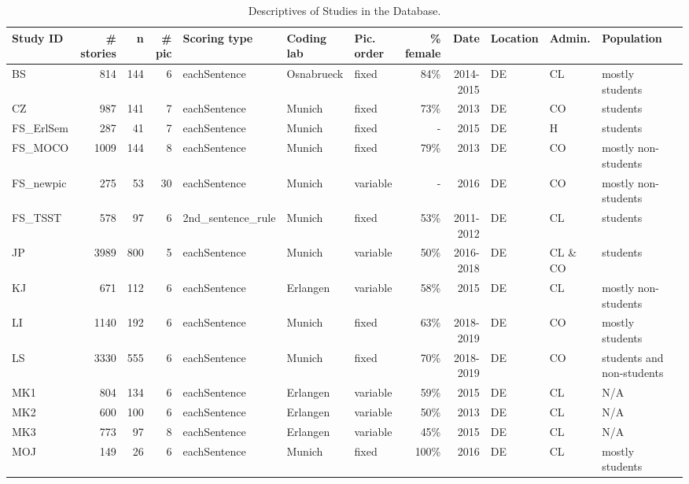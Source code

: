 \documentclass[jou,a4paper]{apa6}\usepackage[]{graphicx}\usepackage[]{color}
\begin{document}
\begin{table}
\begin{threeparttable}
		\caption{Descriptives of Studies in the Database.}
		\label{tab:studies}
		\scriptsize
		\begin{tabularx}{\textwidth}{lrrrlllrrllll}
		\toprule


Study ID & \# stories & n & \# pic & Scoring type & Coding lab & Pic. order & \% female & Date & Location & Admin. & Population \\ 
  \hline
BS & 814 & 144 &   6 & eachSentence & Osnabrueck & fixed & 84\% & 2014-2015 & DE & CL & mostly students \\ 
  CZ & 987 & 141 &   7 & eachSentence & Munich & fixed & 73\% & 2013 & DE & CO & students \\ 
  FS\_ErlSem & 287 &  41 &   7 & eachSentence & Munich & fixed & - & 2015 & DE & H & students \\ 
  FS\_MOCO & 1009 & 144 &   8 & eachSentence & Munich & fixed & 79\% & 2013 & DE & CO & mostly non-students \\ 
  FS\_newpic & 275 &  53 &  30 & eachSentence & Munich & variable & - & 2016 & DE & CO & mostly non-students \\ 
  FS\_TSST & 578 &  97 &   6 & 2nd\_sentence\_rule & Munich & fixed & 53\% & 2011-2012 & DE & CL & students \\ 
  JP & 3989 & 800 &   5 & eachSentence & Munich & variable & 50\% & 2016-2018 & DE & CL \& CO & students \\ 
  KJ & 671 & 112 &   6 & eachSentence & Erlangen & variable & 58\% & 2015 & DE & CL & mostly non-students \\ 
  LI & 1140 & 192 &   6 & eachSentence & Munich & fixed & 63\% & 2018-2019 & DE & CO & mostly students \\ 
  LS & 3330 & 555 &   6 & eachSentence & Munich & fixed & 70\% & 2018-2019 & DE & CO & students and non-students \\ 
  MK1 & 804 & 134 &   6 & eachSentence & Erlangen & variable & 59\% & 2015 & DE & CL & N/A \\ 
  MK2 & 600 & 100 &   6 & eachSentence & Erlangen & variable & 50\% & 2013 & DE & CL & N/A \\ 
  MK3 & 773 &  97 &   8 & eachSentence & Erlangen & variable & 45\% & 2015 & DE & CL & N/A \\ 
  MOJ & 149 &  26 &   6 & eachSentence & Munich & fixed & 100\% & 2016 & DE & CL & mostly students \\ 

\end{tabularx}
\end{threeparttable}
\end{table}
\end{document}
